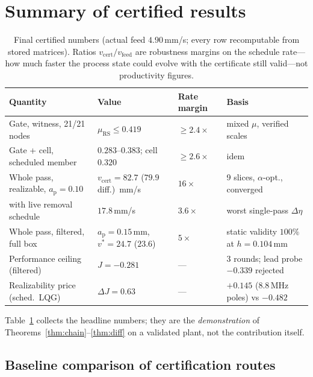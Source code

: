 \documentclass[preprint,12pt]{elsarticle}
\newcommand{\ap}{a_{\mathrm{p}}}
\newcommand{\vcert}{v_{\mathrm{cert}}}
\newcommand{\muRS}{\mu_{\mathrm{RS}}}
\begin{document}
\section{Summary of certified results}

\begin{table}[t]
\centering\footnotesize
\caption{Final certified numbers (actual feed $4.90$\,mm/s; every row
recomputable from stored matrices).  Ratios $\vcert /
v_{\mathrm{feed}}$ are robustness margins on the schedule rate---how
much faster the process state could evolve with the certificate still
valid---not productivity figures.}
\label{tab:final}
\setlength{\tabcolsep}{4pt}
\begin{tabular}{@{}p{3.6cm}p{3.3cm}p{1.6cm}p{4.0cm}@{}}
\toprule
Quantity & Value & Rate margin & Basis \\
\midrule
Gate, witness, 21/21 nodes & $\muRS \le 0.419$ & $\ge 2.4\times$ &
mixed $\mu$, verified scales \\
Gate + cell, scheduled member & $0.283$--$0.383$; cell $0.320$ &
$\ge 2.6\times$ & idem \\
Whole pass, realizable, $\ap{=}0.10$ & $\vcert = 82.7$ ($79.9$ diff.)
\,mm/s & $16\times$ & 9 slices, $\alpha$-opt., converged \\
\quad with live removal schedule & $17.8$\,mm/s & $3.6\times$ &
worst single-pass $\Delta\eta$ \\
Whole pass, filtered, full box & $\ap = 0.15$\,mm, $v^{*}{=}24.7$
($23.6$) & $5\times$ & static validity $100\%$ at $h{=}0.104$\,mm \\
Performance ceiling (filtered) & $J = -0.281$ & --- & 3 rounds;
lead probe $-0.339$ rejected \\
Realizability price (sched.\ LQG) & $\Delta J = 0.63$ & --- &
$+0.145$ (8.8\,MHz poles) vs $-0.482$ \\
\bottomrule
\end{tabular}
\end{table}

Table~\ref{tab:final} collects the headline numbers; they are the
\emph{demonstration} of Theorems~\ref{thm:chain}--\ref{thm:diff} on
a validated plant, not the contribution itself.

\subsection*{Baseline comparison of certification routes}
\end{document}
